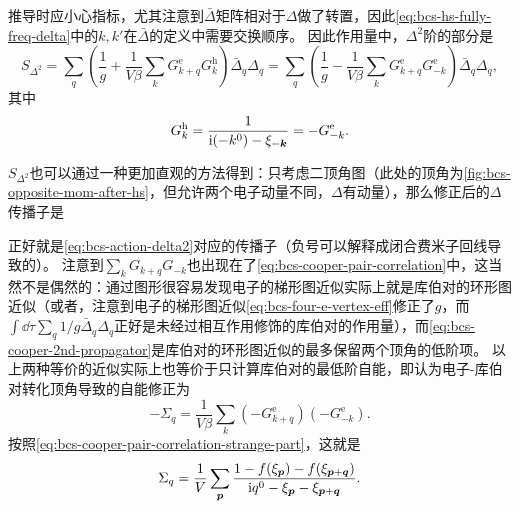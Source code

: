 推导时应小心指标，尤其注意到$\bar{\Delta}$矩阵相对于$\Delta$做了转置，因此\eqref{eq:bcs-hs-fully-freq-delta}中的$k, k'$在$\bar{\Delta}$的定义中需要交换顺序。
因此作用量中，$\Delta^2$阶的部分是
\begin{equation}
    S_{\Delta^2} = \sum_{q} \left( \frac{1}{g} + \frac{1}{V \beta} \sum_k G^\text{e}_{k+q} G^\text{h}_k \right) \bar{\Delta}_{q} \Delta_{q} = \sum_{q} \left( \frac{1}{g} - \frac{1}{V \beta} \sum_k G^\text{e}_{k+q} G^\text{e}_{-k} \right) \bar{\Delta}_{q} \Delta_{q},
    \label{eq:bcs-action-delta2}
\end{equation}
其中
\begin{equation}
    G^\text{h}_{k} = \frac{1}{\mathrm{i}(- k^0) - \xi_{- \vb*{k}}} = - G^\text{e}_{-k}.
\end{equation}

$S_{\Delta^2}$也可以通过一种更加直观的方法得到：只考虑二顶角图（此处的顶角为\autoref{fig:bcs-opposite-mom-after-hs}，但允许两个电子动量不同，$\Delta$有动量），那么修正后的$\Delta$传播子是

正好就是\eqref{eq:bcs-action-delta2}对应的传播子（负号可以解释成闭合费米子回线导致的）。
注意到$\sum_{k} G_{k+q} G_{-k}$也出现在了\eqref{eq:bcs-cooper-pair-correlation}中，这当然不是偶然的：通过图形很容易发现电子的梯形图近似实际上就是库伯对的环形图近似（或者，注意到电子的梯形图近似\eqref{eq:bcs-four-e-vertex-eff}修正了$g$，而$\int \dd{\tau} \sum_q 1/g \bar{\Delta}_q \Delta_q$正好是未经过相互作用修饰的库伯对的作用量），而\eqref{eq:bcs-cooper-2nd-propagator}是库伯对的环形图近似的最多保留两个顶角的低阶项。
以上两种等价的近似实际上也等价于只计算库伯对的最低阶自能，即认为电子-库伯对转化顶角导致的自能修正为
\begin{equation}
    - \Sigma_q = \frac{1}{V \beta} \sum_{k} (- G^\text{e}_{k+q}) (- G^\text{e}_{-k}).
\end{equation}
按照\eqref{eq:bcs-cooper-pair-correlation-strange-part}，这就是
\begin{equation}
    \Sigma_q = \frac{1}{V} \sum_{\vb*{p}} \frac{1 - f(\xi_{\vb*{p}}) - f(\xi_{\vb*{p}+\vb*{q}})}{\mathrm{i} q^0 - \xi_{\vb*{p}} - \xi_{\vb*{p} + \vb*{q}}}.
\end{equation}

